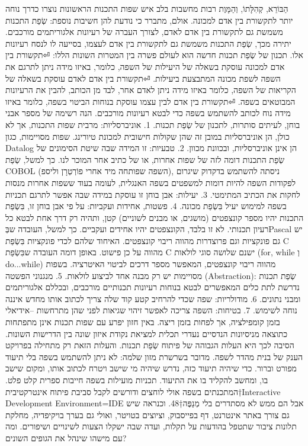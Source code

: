 \begin{טבלא}[!htbp]
      הַבּוֹרֵא, קְהִלָּתוֹ, וְהַמָּוֶת
      רבות מחשבות בלב איש
      שפות התכנות הראשונות נוצרו כדרך נוחה יותר לתקשורת בין אדם למכונה. אולם, מתברר כי נודעת להן חשיבות נוספת: שְׂפַת התכנות משמשת גם לתקשורת בין אדם לאדם, לצורך העברה של רעיונות אלגוריתמים מורכבים. יתירה מכך, שְׂפַת התכנות משמשת גם לתקשורת בין אדם לעצמו, בסייעה לו לנסח רעיונות אלו.
      תכנון של שְׂפַת תכנות חדשה הוא לעולם פשרה בין המטרות השונות הללו:
⏎תקשורת בין אדם למכונה עוסקת בשאלה של היעילות של השפה, כלומר, באיזו מידה ניתן לתרגם את השפה לשפת מכונה המתבצעת ביעילות.
⏎תקשורת בין אדם לאדם עוסקת בשאלה של הקריאות של השפה, כלומר באיזו מידה ניתן לאדם אחר, לבד מן הכותב, להבין את הרעיונות המבוטאים בשפה.
⏎תקשורת בין אדם לבין עצמו עוסקת בנוחות הביטוי בשפה, כלומר באיזו מידה נוח לכותב להשתמש בשפה כדי לבטא רעיונות מורכבים.
      הנה רשימה של מספר אבני בוחן, לעיתים סותרות, לתכנון של שְׂפַת תכנות.
      1. אוניברסליות: מרבית שפות התכנות, אך לא כולן, הן אוניברסליות במובן זה שהן שקולות חישובית למכונת טיורינג. שפות מסויימות, כגון Datalog הן אינן אוניברסליות, ובכוונת מכוון.
      2. טבעיות: זו המידה שבה שיטת הסימונים של שְׂפַת התכנות דומה לזה של שפות אחרות, או של כתיב אחר המוכר לנו. כך למשל, שְׂפַת COBOL (השפה שפותחה מיד אחרי פוֹרְטְרָן וליספ), ניסתה להשתמש בדקדוק שיגרום לפקודות השפה להיות דומות למשפטים בשפה האנגלית, לעומה בעוד ששפות אחרות מנסות לחקות את הכתיב המתימטי.
      3. יעילות: אבן בוחן זו עוסקת במידה שבה אפשר לתרגם תכניות בשפה למימוש יעיל בִּשְׂפַת מכונה.
      4. פשטות, אחידות ועקביות: על פי אבן בוחן זו, בִּשְׂפַת התכנות יהיו מספר קונצפטים (מושגים, או מבנים לשוניים) קטן, ותהיה רק דרך אחת לבטא כל רעיון תכנותי. לא זו בלבד, הקונצפטים יהיו אחידים ועקביים. כך למשל, העובדה שבְּPascal יש גם פונקציות וגם פרוצדרות מהווה ריבוי קונצפטים. האיחוד שלהם לכדי פונקציות בִּשְׂפַת C מהווה על כן פישוט. באופן דומה העובדה שבִּשְׂפַת C ישנם שלושה סוגי לולאות (for, while וְ do...while) מהווה ריבוי קונצפטים, המאפשר מספר דרכים לביטוי האיטרציה. בשפות מסויימות יש רק מבנה אחד לביצוע לולאות.
      5. מנגנוני הפשטה (Abstraction): שְׂפַת תכנות נדרשת לתת כלים המאפשרים לבטא בנוחות רעיונות תכנותיים מורכבים, ובכללם אלגוריתמים ומבני נתונים.
      6. מודולריות: שפה שכדי להרחיב קטע קוד שלה צריך לכתוב אותו מחדש איננה נוחה לשימוש.
      7. בטיחות: השפה צריכה לאפשר זיהוי שגיאות לפני שהן מתרחשות –אידיאלי בזמן קומפילציה, אך לפחות בזמן ריצה.
      באין חזון יפרע עם
      שפות תכנות אינן מתפתחות כתוצאה מניסיונות הנדסיים נעדרי תכלית למציאת נקודת איזון שונה בין הדרישות השונות.
      הסיבה לכך היא העלות הגבוהה של פיתוח שְׂפַת תכנות. והעלות הזאת רק מתחילה בפרויקט הענק של בנית מהדר לשפה. מדובר בשרשרת מזון שלמה: לא ניתן להשתמש בשפה בלי תיעוד מפורט וברור. כדי שיהיה תיעוד כזה, נדרש שיהיה מי שישב ויטרח לכתוב אותו, ומקום שישב בו, ומחשב להקליד בו את התיעוד. תכניות מועילות בשפה חייבות ספרית קלט פלט. המתכנתים בשפה אולי לוחצים ודורשים לקבל סביבת פיתוח אינטרקטיבית†{Interactive Development Environment=IDE} אבל הם ממש לא מסתדרים בלי מְנַפֶּה†{48}. וכנראה שיש גם צורך באתר אינטרנט, דף בפייסבוק, וציוצים בטויטר, ואולי גם בערך בויקיפדיה, מחלקת תלונות ציבור שתטפל בהודעות על תקלות, ועדה שבה ישקלו הצעות לשינויים ושיפורים. ומה עם מישהו שינהל את הגופים השונים?

\end{טבלא}
